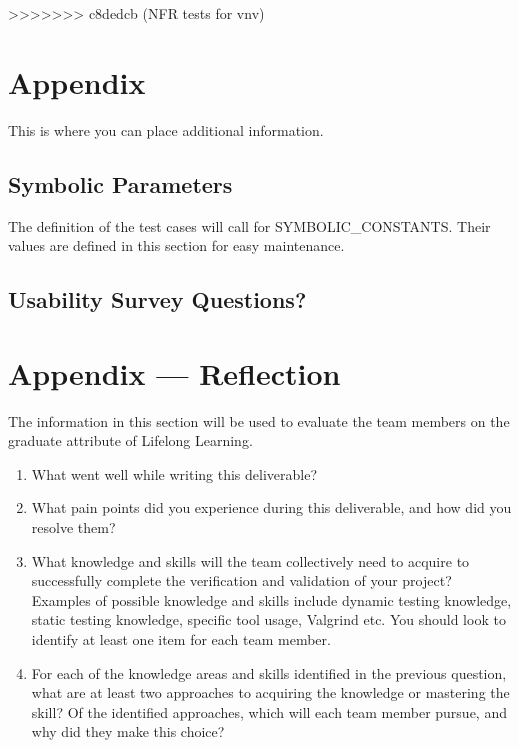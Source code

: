 \documentclass[12pt, titlepage]{article}
\begin{document}
>>>>>>> c8dedcb (NFR tests for vnv)




\newpage

\section{Appendix}

This is where you can place additional information.

\subsection{Symbolic Parameters}

The definition of the test cases will call for SYMBOLIC\_CONSTANTS.
Their values are defined in this section for easy maintenance.

\subsection{Usability Survey Questions?}


\newpage{}
\section*{Appendix --- Reflection}


The information in this section will be used to evaluate the team members on the
graduate attribute of Lifelong Learning.


\begin{enumerate}
  \item What went well while writing this deliverable? 
  \item What pain points did you experience during this deliverable, and how
    did you resolve them?
  \item What knowledge and skills will the team collectively need to acquire to
  successfully complete the verification and validation of your project?
  Examples of possible knowledge and skills include dynamic testing knowledge,
  static testing knowledge, specific tool usage, Valgrind etc.  You should look to
  identify at least one item for each team member.
  \item For each of the knowledge areas and skills identified in the previous
  question, what are at least two approaches to acquiring the knowledge or
  mastering the skill?  Of the identified approaches, which will each team
  member pursue, and why did they make this choice?
\end{enumerate}
\end{document}
